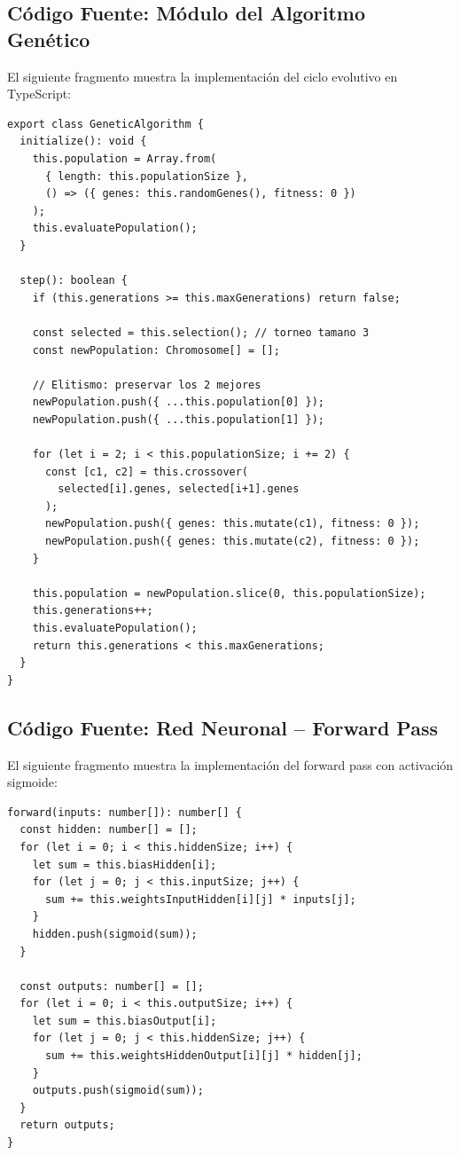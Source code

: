 \documentclass[12pt,a4paper]{article}
\begin{document}
\subsection{C\'odigo Fuente: M\'odulo del Algoritmo Gen\'etico}

El siguiente fragmento muestra la implementaci\'on del ciclo evolutivo en TypeScript:

\begin{lstlisting}
export class GeneticAlgorithm {
  initialize(): void {
    this.population = Array.from(
      { length: this.populationSize },
      () => ({ genes: this.randomGenes(), fitness: 0 })
    );
    this.evaluatePopulation();
  }

  step(): boolean {
    if (this.generations >= this.maxGenerations) return false;

    const selected = this.selection(); // torneo tamano 3
    const newPopulation: Chromosome[] = [];

    // Elitismo: preservar los 2 mejores
    newPopulation.push({ ...this.population[0] });
    newPopulation.push({ ...this.population[1] });

    for (let i = 2; i < this.populationSize; i += 2) {
      const [c1, c2] = this.crossover(
        selected[i].genes, selected[i+1].genes
      );
      newPopulation.push({ genes: this.mutate(c1), fitness: 0 });
      newPopulation.push({ genes: this.mutate(c2), fitness: 0 });
    }

    this.population = newPopulation.slice(0, this.populationSize);
    this.generations++;
    this.evaluatePopulation();
    return this.generations < this.maxGenerations;
  }
}
\end{lstlisting}

\subsection{C\'odigo Fuente: Red Neuronal -- Forward Pass}

El siguiente fragmento muestra la implementaci\'on del forward pass con activaci\'on sigmoide:

\begin{lstlisting}
forward(inputs: number[]): number[] {
  const hidden: number[] = [];
  for (let i = 0; i < this.hiddenSize; i++) {
    let sum = this.biasHidden[i];
    for (let j = 0; j < this.inputSize; j++) {
      sum += this.weightsInputHidden[i][j] * inputs[j];
    }
    hidden.push(sigmoid(sum));
  }

  const outputs: number[] = [];
  for (let i = 0; i < this.outputSize; i++) {
    let sum = this.biasOutput[i];
    for (let j = 0; j < this.hiddenSize; j++) {
      sum += this.weightsHiddenOutput[i][j] * hidden[j];
    }
    outputs.push(sigmoid(sum));
  }
  return outputs;
}
\end{lstlisting}
\end{document}
